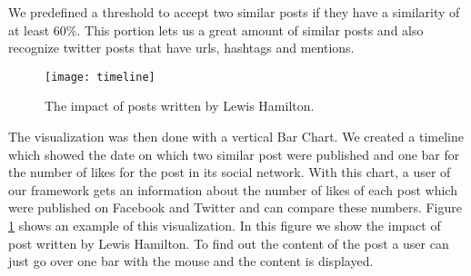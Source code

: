 We predefined a threshold to accept two similar posts if they have a similarity of at least $60\%$. This portion lets us a great amount of similar posts and also recognize twitter posts that have urls, hashtags and mentions.

\begin{figure}[t]
	\centering
	\texttt{[image: timeline]}
	\caption{The impact of posts written by Lewis Hamilton.}
	\label{fig:impact}
\end{figure}

The visualization was then done with a vertical Bar Chart. We created a timeline which showed the date on which two similar post were published and one bar for the number of likes for the post in its social network. With this chart, a user of our framework gets an information about the number of likes of each post which were published on Facebook and Twitter and can compare these numbers. Figure \ref{fig:impact} shows an example of this visualization. In this figure we show the impact of post written by Lewis Hamilton. To find out the content of the post a user can just go over one bar with the mouse and the content is displayed. 




